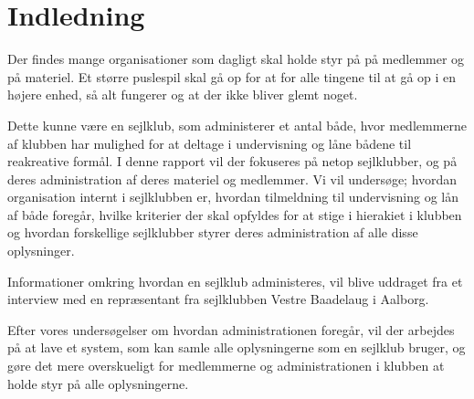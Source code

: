 \chapter{Indledning}\label{chap:indledning}

\cbstart

Der findes mange organisationer som dagligt skal holde styr på på medlemmer og på materiel. Et større
puslespil skal gå op for at for alle tingene til at gå op i en højere enhed, så alt fungerer og at der ikke
bliver glemt noget.

Dette kunne være en sejlklub, som administerer et antal både, hvor medlemmerne af klubben har mulighed for at
deltage i undervisning og låne bådene til reakreative formål. I denne rapport vil der fokuseres på netop
sejlklubber, og på deres administration af deres materiel og medlemmer. Vi vil undersøge; hvordan organisation
internt i sejlklubben er, hvordan tilmeldning til undervisning og lån af både foregår, hvilke kriterier der
skal opfyldes for at stige i hierakiet i klubben og hvordan forskellige sejlklubber styrer deres
administration af alle disse oplysninger.

Informationer omkring hvordan en sejlklub administeres, vil blive uddraget fra et interview med en
repræsentant fra sejlklubben Vestre Baadelaug i Aalborg.

Efter vores undersøgelser om hvordan administrationen foregår, vil der arbejdes på at lave et system, som kan
samle alle oplysningerne som en sejlklub bruger, og gøre det mere overskueligt for medlemmerne og
administrationen i klubben at holde styr på alle oplysningerne.

\cbend

